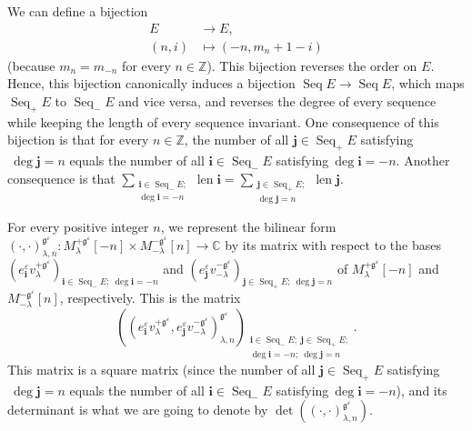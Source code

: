 \documentclass[etingof-lie.tex]{subfiles}
\begin{document}
\begin{Convention}
We can define a bijection%
\begin{align*}
E  &  \rightarrow E,\\
\left(  n,i\right)   &  \mapsto\left(  -n,m_{n}+1-i\right)
\end{align*}
(because $m_{n}=m_{-n}$ for every $n\in\mathbb{Z}$). This bijection reverses
the order on $E$. Hence, this bijection canonically induces a bijection
$\operatorname*{Seq}E\rightarrow\operatorname*{Seq}E$, which maps
$\operatorname*{Seq}\nolimits_{+}E$ to $\operatorname*{Seq}\nolimits_{-}E$ and
vice versa, and reverses the degree of every sequence while keeping the length
of every sequence invariant. One consequence of this bijection is that for
every $n\in\mathbb{Z}$, the number of all $\mathbf{j}\in\operatorname*{Seq}%
\nolimits_{+}E$ satisfying$\ \deg\mathbf{j}=n$ equals the number of all
$\mathbf{i}\in\operatorname*{Seq}\nolimits_{-}E$ satisfying$\ \deg
\mathbf{i}=-n$. Another consequence is that $\sum\limits_{\substack{\mathbf{i}%
\in\operatorname*{Seq}\nolimits_{-}E;\\\deg\mathbf{i}=-n}}\operatorname*{len}%
\mathbf{i=}\sum\limits_{\substack{\mathbf{j}\in\operatorname*{Seq}%
\nolimits_{+}E;\\\deg\mathbf{j}=n}}\operatorname*{len}\mathbf{j}$.

For every positive integer $n$, we represent the bilinear form $\left(
\cdot,\cdot\right)  _{\lambda,n}^{\mathfrak{g}^{\varepsilon}}:M_{\lambda
}^{+\mathfrak{g}^{\varepsilon}}\left[  -n\right]  \times M_{-\lambda
}^{-\mathfrak{g}^{\varepsilon}}\left[  n\right]  \rightarrow\mathbb{C}$ by its
matrix with respect to the bases $\left(  e_{\mathbf{i}}^{\varepsilon
}v_{\lambda}^{+\mathfrak{g}^{\varepsilon}}\right)  _{\mathbf{i}\in
\operatorname*{Seq}\nolimits_{-}E;\ \deg\mathbf{i}=-n}$ and $\left(
e_{\mathbf{j}}^{\varepsilon}v_{-\lambda}^{-\mathfrak{g}^{\varepsilon}}\right)
_{\mathbf{j}\in\operatorname*{Seq}\nolimits_{+}E;\ \deg\mathbf{j}=n}$ of
$M_{\lambda}^{+\mathfrak{g}^{\varepsilon}}\left[  -n\right]  $ and
$M_{-\lambda}^{-\mathfrak{g}^{\varepsilon}}\left[  n\right]  $, respectively.
This is the matrix%
\[
\left(  \left(  e_{\mathbf{i}}^{\varepsilon}v_{\lambda}^{+\mathfrak{g}%
^{\varepsilon}},e_{\mathbf{j}}^{\varepsilon}v_{-\lambda}^{-\mathfrak{g}%
^{\varepsilon}}\right)  _{\lambda,n}^{\mathfrak{g}^{\varepsilon}}\right)
_{\substack{\mathbf{i}\in\operatorname*{Seq}\nolimits_{-}E;\ \mathbf{j}%
\in\operatorname*{Seq}\nolimits_{+}E;\\\deg\mathbf{i}=-n;\ \deg\mathbf{j}%
=n}}.
\]
This matrix is a square matrix (since the number of all $\mathbf{j}%
\in\operatorname*{Seq}\nolimits_{+}E$ satisfying$\ \deg\mathbf{j}=n$ equals
the number of all $\mathbf{i}\in\operatorname*{Seq}\nolimits_{-}E$
satisfying$\ \deg\mathbf{i}=-n$), and its determinant is what we are going to
denote by $\det\left(  \left(  \cdot,\cdot\right)  _{\lambda,n}^{\mathfrak{g}%
^{\varepsilon}}\right)  $.
\end{Convention}
\end{document}
